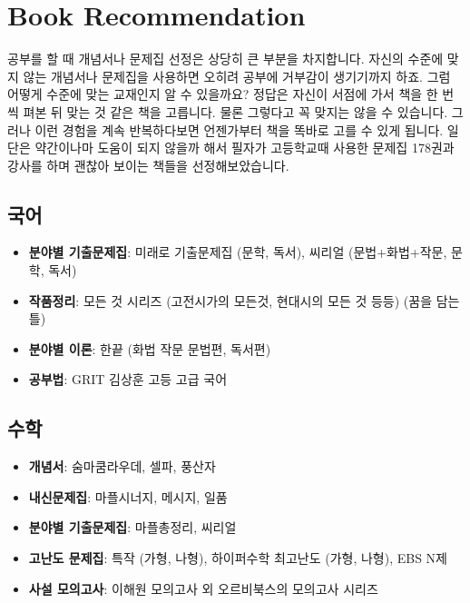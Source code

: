 \documentclass[final]{IEEEphot}
\begin{document}
\pagebreak

\section*{Book Recommendation}

\hspace{0.3cm} 공부를 할 때 개념서나 문제집 선정은 상당히 큰 부분을 차지합니다. 자신의 수준에 맞지 않는 개념서나 문제집을 사용하면 오히려 공부에 거부감이 생기기까지 하죠.
그럼 어떻게 수준에 맞는 교재인지 알 수 있을까요? 정답은 자신이 서점에 가서 책을 한 번 씩 펴본 뒤 맞는 것 같은 책을 고릅니다. 물론 그렇다고 꼭 맞지는 않을 수 있습니다. 그러나 이런 경험을
계속 반복하다보면 언젠가부터 책을 똑바로 고를 수 있게 됩니다. 일단은 약간이나마 도움이 되지 않을까 해서 필자가 고등학교때 사용한 문제집 178권과 강사를 하며 괜찮아 보이는 책들을 선정해보았습니다.

\subsection*{국어}

\vspace{0.1cm}

\begin{itemize}
 \item \textbf{분야별 기출문제집}: 미래로 기출문제집 (문학, 독서), 씨리얼 (문법+화법+작문, 문학, 독서)
 \item \textbf{작품정리}: 모든 것 시리즈 (고전시가의 모든것, 현대시의 모든 것 등등) (꿈을 담는 틀)
 \item \textbf{분야별 이론}: 한끝 (화법 작문 문법편, 독서편)
 \item \textbf{공부법}: GRIT 김상훈 고등 고급 국어
\end{itemize}

\subsection*{수학}

\vspace{0.1cm}

\begin{itemize}
 \item \textbf{개념서}: 숨마쿰라우데, 셀파, 풍산자
 \item \textbf{내신문제집}: 마플시너지, 메시지, 일품
 \item \textbf{분야별 기출문제집}: 마플총정리, 씨리얼
 \item \textbf{고난도 문제집}: 특작 (가형, 나형), 하이퍼수학 최고난도 (가형, 나형), EBS N제
 \item \textbf{사설 모의고사}: 이해원 모의고사 외 오르비북스의 모의고사 시리즈
\end{itemize}
\end{document}
